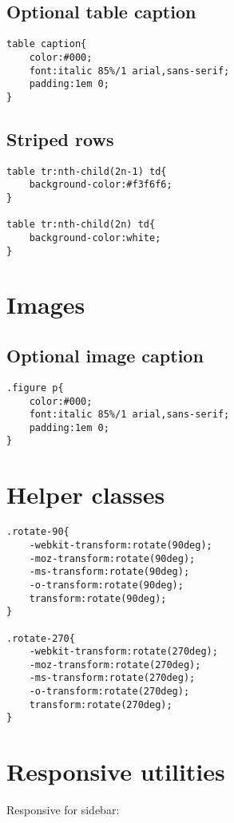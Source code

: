 \documentclass[11pt]{article}
\begin{document}
\subsection{Optional table caption}
\label{sec:org95b7af8}

\begin{verbatim}
table caption{
    color:#000;
    font:italic 85%/1 arial,sans-serif;
    padding:1em 0;
}
\end{verbatim}

\subsection{Striped rows}
\label{sec:orga130265}

\begin{verbatim}
table tr:nth-child(2n-1) td{
    background-color:#f3f6f6;
}

table tr:nth-child(2n) td{
    background-color:white;
}
\end{verbatim}

\section{Images}
\label{sec:org34f860c}
\subsection{Optional image caption}
\label{sec:org417f4ac}

\begin{verbatim}
.figure p{
    color:#000;
    font:italic 85%/1 arial,sans-serif;
    padding:1em 0;
}
\end{verbatim}

\section{Helper classes}
\label{sec:org425a37e}
\begin{verbatim}
.rotate-90{
    -webkit-transform:rotate(90deg);
    -moz-transform:rotate(90deg);
    -ms-transform:rotate(90deg);
    -o-transform:rotate(90deg);
    transform:rotate(90deg);
}

.rotate-270{
    -webkit-transform:rotate(270deg);
    -moz-transform:rotate(270deg);
    -ms-transform:rotate(270deg);
    -o-transform:rotate(270deg);
    transform:rotate(270deg);
}
\end{verbatim}

\section{Responsive utilities}
\label{sec:orgb238199}
Responsive for sidebar:
\end{document}
